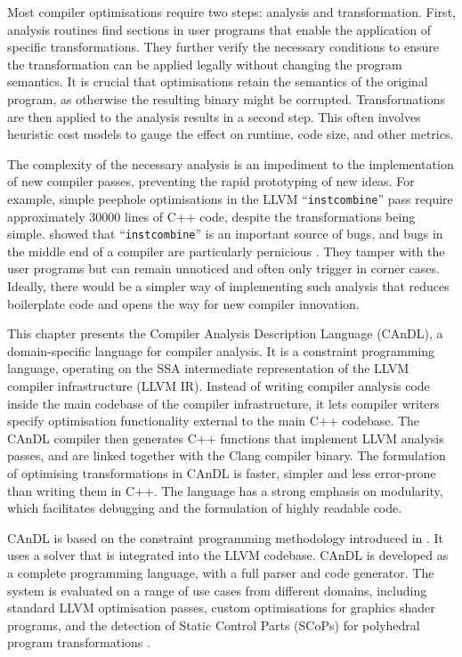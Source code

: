     Most compiler optimisations require two steps:
    analysis and transformation.
    First, analysis routines find sections in user programs that enable the
    application of specific transformations.
    They further verify the necessary conditions to ensure the transformation
    can be applied legally without changing the program semantics.
    It is crucial that optimisations retain the semantics of the original
    program, as otherwise the resulting binary might be corrupted.
    Transformations are then applied to the analysis results in a second step.
    This often involves heuristic cost models to gauge the effect on runtime,
    code size, and other metrics.

    The complexity of the necessary analysis is an impediment to
    the implementation of new compiler passes, preventing the rapid
    prototyping of new ideas.
    For example, simple peephole optimisations in the LLVM ``{\tt instcombine}''
    pass require approximately 30000 lines of C++ code, despite the
    transformations being simple.
    \citet{Menendez:2017:ADP:3062341.3062372} showed that ``{\tt instcombine}''
    is an important source of bugs, and bugs in the middle end of a compiler are
    particularly pernicious \citep{Yang:2011:FUB:1993316.1993532}.
    They tamper with the user programs but can remain unnoticed and often only
    trigger in corner cases.
    Ideally, there would be a simpler way of implementing such analysis that
    reduces boilerplate code and opens the way for new compiler innovation.

    This chapter presents the Compiler Analysis Description Language (CAnDL), a
    domain-specific language for compiler analysis.
    It is a constraint programming language, operating on the SSA intermediate
    representation of the LLVM compiler infrastructure (LLVM IR).
    Instead of writing compiler analysis code inside the main codebase of the
    compiler infrastructure, it lets compiler writers specify optimisation
    functionality external to the main C++ codebase.
    The CAnDL compiler then generates C++ functions that implement LLVM analysis
    passes, and are linked together with the Clang compiler binary.
    The formulation of optimising transformations in CAnDL is faster, simpler
    and less error-prone than writing them in C++.
    The language has a strong emphasis on modularity, which facilitates
    debugging and the formulation of highly readable code.

    CAnDL is based on the constraint programming methodology introduced in
    .
    It uses a solver that is integrated into the LLVM codebase.
    CAnDL is developed as a complete programming language, with a full parser
    and code generator.
    The system is evaluated on a range of use cases from
    different domains, including standard LLVM optimisation passes,
    custom optimisations for graphics shader programs, and the detection of
    Static Control Parts (SCoPs) \citep{Lengauer2012Polly} for polyhedral
    program transformations \citep{Karp:1967:OCU:321406.321418}.


